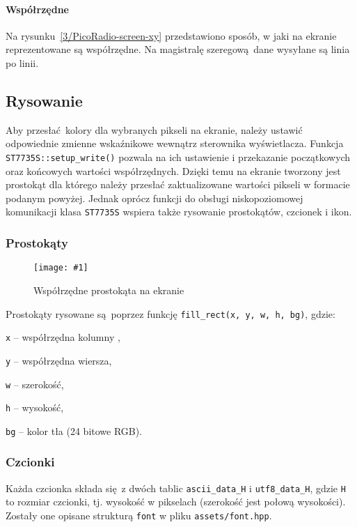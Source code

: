 \documentclass[12pt]{report}
\let\tempone\itemize
\let\temptwo\enditemize
\renewenvironment{itemize}{\tempone\setlength{\itemsep}{0cm}}{\temptwo}
\newcommand{\imgint}[4]{
	\begin{figure}[{#4}]
		\centering
		\texttt{[image: \#1]}
		\caption{#2}
		\label{#1}
	\end{figure}
}
\newcommand{\imgh}[3]{\imgint{#1}{#2}{#3}{H}}
\begin{document}
		\paragraph{Współrzędne}
			Na rysunku~\ref{3/PicoRadio-screen-xy} przedstawiono sposób, w jaki na ekranie reprezentowane są współrzędne. Na magistralę szeregową dane wysyłane są linia po linii.
		
		\subsection{Rysowanie}
			Aby przesłać kolory dla wybranych pikseli na ekranie, należy ustawić odpowiednie zmienne wskaźnikowe wewnątrz sterownika wyświetlacza. Funkcja \lstinline|ST7735S::setup_write()| pozwala na ich ustawienie i przekazanie początkowych oraz końcowych wartości współrzędnych. Dzięki temu na ekranie tworzony jest prostokąt dla którego należy przesłać zaktualizowane wartości pikseli w formacie podanym powyżej. Jednak oprócz funkcji do obsługi niskopoziomowej komunikacji klasa \lstinline|ST7735S|  wspiera także rysowanie prostokątów, czcionek i ikon.
			
			\subsubsection{Prostokąty}
				\imgh{3/PicoRadio-screen-rect}{Współrzędne prostokąta na ekranie}{0.6}
				Prostokąty rysowane są poprzez funkcję \lstinline|fill_rect(x, y, w, h, bg)|, gdzie:
				\begin{itemize}
					\item \lstinline|x| -- współrzędna kolumny ,
					\item \lstinline|y| -- współrzędna wiersza,
					\item \lstinline|w| -- szerokość,
					\item \lstinline|h| -- wysokość,
					\item \lstinline|bg| -- kolor tła (24 bitowe RGB).
				\end{itemize}
			
			\subsubsection{Czcionki}
				Każda czcionka składa się z dwóch tablic \lstinline|ascii_data_H| i \lstinline|utf8_data_H|, gdzie \lstinline|H| to rozmiar czcionki, tj. wysokość w pikselach (szerokość jest połową wysokości). Zostały one opisane strukturą \lstinline|font| w pliku \lstinline|assets/font.hpp|.
				
\end{document}

